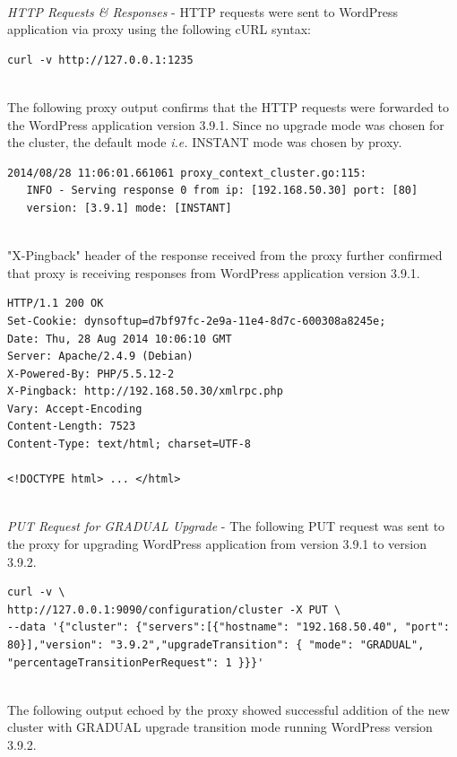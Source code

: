 \documentclass[a4paper,11pt,twoside]{report}
\begin{document}
\noindent\\
\textit{HTTP Requests \& Responses} - HTTP requests were sent to WordPress application via proxy using the following cURL syntax:\smallskip

\begin{lstlisting}[language=terminal]
curl -v http://127.0.0.1:1235
\end{lstlisting}

\noindent\\
The following proxy output confirms that the HTTP requests were forwarded to the WordPress application version 3.9.1. Since no upgrade mode was chosen for the cluster, the default mode \textit{i.e.} INSTANT mode was chosen by proxy. \smallskip

\begin{lstlisting}[language=terminal]
2014/08/28 11:06:01.661061 proxy_context_cluster.go:115:     
   INFO - Serving response 0 from ip: [192.168.50.30] port: [80] 
   version: [3.9.1] mode: [INSTANT]
\end{lstlisting}

\noindent\\
"X-Pingback" header of the response received from the proxy further confirmed that proxy is receiving responses from WordPress application version 3.9.1.\smallskip 

\begin{lstlisting}[language=terminal]
HTTP/1.1 200 OK
Set-Cookie: dynsoftup=d7bf97fc-2e9a-11e4-8d7c-600308a8245e;
Date: Thu, 28 Aug 2014 10:06:10 GMT
Server: Apache/2.4.9 (Debian)
X-Powered-By: PHP/5.5.12-2
X-Pingback: http://192.168.50.30/xmlrpc.php
Vary: Accept-Encoding
Content-Length: 7523
Content-Type: text/html; charset=UTF-8
 
<!DOCTYPE html> ... </html>
\end{lstlisting}

\noindent\\
\textit{PUT Request for GRADUAL Upgrade} - The following PUT request was sent to the proxy for upgrading WordPress application from version 3.9.1 to version 3.9.2.\smallskip

\begin{lstlisting}[language=terminal]
curl -v \
http://127.0.0.1:9090/configuration/cluster -X PUT \
--data '{"cluster": {"servers":[{"hostname": "192.168.50.40", "port": 80}],"version": "3.9.2","upgradeTransition": { "mode": "GRADUAL", "percentageTransitionPerRequest": 1 }}}'
\end{lstlisting}
 
\noindent \\
The following output echoed by the proxy showed successful addition of the new cluster with GRADUAL upgrade transition mode running WordPress version 3.9.2. \smallskip
\end{document}
